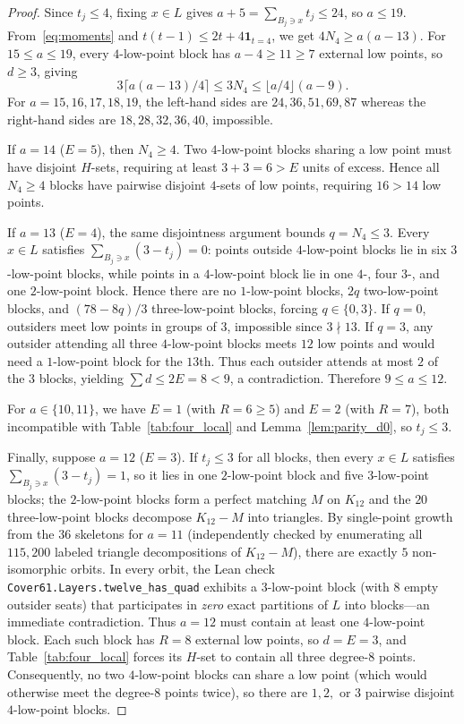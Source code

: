 \documentclass[11pt,a4paper]{article}
\theoremstyle{definition}
\theoremstyle{remark}
\begin{document}
\begin{proof}
Since $t_j \le 4$, fixing $x \in L$ gives $a + 5 = \sum_{B_j \ni x} t_j \le 24$, so $a \le 19$. From~\eqref{eq:moments} and $t(t-1) \le 2t + 4\mathbf{1}_{t=4}$, we get $4N_4 \ge a(a-13)$. For $15 \le a \le 19$, every $4$-low-point block has $a - 4 \ge 11 \ge 7$ external low points, so $d \ge 3$, giving
\[
  3\lceil a(a-13)/4 \rceil \le 3N_4 \le \lfloor a/4 \rfloor (a - 9).
\]
For $a = 15,16,17,18,19$, the left-hand sides are $24,36,51,69,87$ whereas the right-hand sides are $18,28,32,36,40$, impossible.

If $a = 14$ ($E = 5$), then $N_4 \ge 4$. Two $4$-low-point blocks sharing a low point must have disjoint $H$-sets, requiring at least $3 + 3 = 6 > E$ units of excess. Hence all $N_4 \ge 4$ blocks have pairwise disjoint $4$-sets of low points, requiring $16 > 14$ low points.

If $a = 13$ ($E = 4$), the same disjointness argument bounds $q = N_4 \le 3$. Every $x \in L$ satisfies $\sum_{B_j \ni x} (3 - t_j) = 0$: points outside $4$-low-point blocks lie in six $3$-low-point blocks, while points in a $4$-low-point block lie in one $4$-, four $3$-, and one $2$-low-point block. Hence there are no $1$-low-point blocks, $2q$ two-low-point blocks, and $(78 - 8q)/3$ three-low-point blocks, forcing $q \in \{0,3\}$. If $q = 0$, outsiders meet low points in groups of $3$, impossible since $3 \nmid 13$. If $q = 3$, any outsider attending all three $4$-low-point blocks meets $12$ low points and would need a $1$-low-point block for the $13$th. Thus each outsider attends at most $2$ of the $3$ blocks, yielding $\sum d \le 2E = 8 < 9$, a contradiction. Therefore $9 \le a \le 12$.

For $a \in \{10,11\}$, we have $E = 1$ (with $R = 6 \ge 5$) and $E = 2$ (with $R = 7$), both incompatible with Table~\ref{tab:four_local} and Lemma~\ref{lem:parity_d0}, so $t_j \le 3$.

Finally, suppose $a = 12$ ($E = 3$). If $t_j \le 3$ for all blocks, then every $x \in L$ satisfies $\sum_{B_j \ni x} (3 - t_j) = 1$, so it lies in one $2$-low-point block and five $3$-low-point blocks; the $2$-low-point blocks form a perfect matching $M$ on $K_{12}$ and the $20$ three-low-point blocks decompose $K_{12} - M$ into triangles. By single-point growth from the $36$ skeletons for $a = 11$ (independently checked by enumerating all $115{,}200$ labeled triangle decompositions of $K_{12} - M$), there are exactly $5$ non-isomorphic orbits. In every orbit, the Lean check \texttt{Cover61.Layers.twelve\_has\_quad} exhibits a $3$-low-point block (with $8$ empty outsider seats) that participates in \emph{zero} exact partitions of $L$ into blocks—an immediate contradiction. Thus $a = 12$ must contain at least one $4$-low-point block. Each such block has $R = 8$ external low points, so $d = E = 3$, and Table~\ref{tab:four_local} forces its $H$-set to contain all three degree-$8$ points. Consequently, no two $4$-low-point blocks can share a low point (which would otherwise meet the degree-$8$ points twice), so there are $1, 2,$ or $3$ pairwise disjoint $4$-low-point blocks.
\end{proof}
\end{document}
